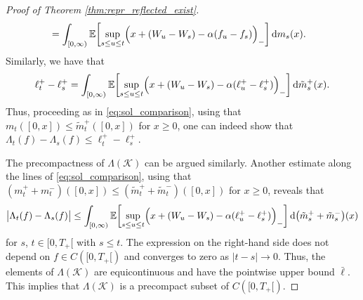 \documentclass[11pt, a4paper]{article}
\theoremstyle{plain}
\theoremstyle{definition}
\theoremstyle{remark}
\numberwithin{equation}{section}
\newcommand{\ev}{\mathbb{E}}
\renewcommand{\d}{\mathrm{d}}
\renewcommand{\cal}[1]{\mathcal{#1}}
\begin{document}
\begin{proof}[Proof of Theorem \ref{thm:repr_reflected_exist}]
\begin{align*}
    &= \int_{[0, \infty)} \ev\biggl[\sup_{s \leq u \leq t} \Bigl(x + (W_u - W_s) - \alpha (f_u - f_s)\Bigr)_-\biggr] \, \d m_s(x).
\end{align*}
Similarly, we have that 
\begin{equation*}
    \ell^+_t - \ell^+_s = \int_{[0, \infty)} \ev\biggl[\sup_{s \leq u \leq t} \Bigl(x + (W_u - W_s) - \alpha (\ell^+_u - \ell^+_s)\Bigr)_-\biggr] \, \d \tilde{m}^+_s(x).
\end{equation*}
Thus, proceeding as in \eqref{eq:sol_comparison}, using that $m_t([0, x]) \leq \tilde{m}^+_t([0, x])$ for $x \geq 0$, one can indeed show that $\Lambda_t(f) - \Lambda_s(f) \leq \ell^+_t - \ell^+_s$.

The precompactness of $\Lambda(\cal{K})$ can be argued similarly. Another estimate along the lines of \eqref{eq:sol_comparison}, using that $(m^+_t + m^-_t)([0, x]) \leq (\tilde{m}^+_t + \tilde{m}^-_t)([0, x])$ for $x \geq 0$, reveals that
\begin{equation*}
    \bigl\lvert \Lambda_t(f) - \Lambda_s(f)\bigr\rvert \leq \int_{[0, \infty)} \ev\biggl[\sup_{s \leq u \leq t} \Bigl(x + (W_u - W_s) - \alpha (\ell^+_u - \ell^+_s)\Bigr)_-\biggr] \, \d \bigl(\tilde{m}^+_s +\tilde{m}^-_s\bigr)(x)
\end{equation*}
for $s$, $t \in [0, T_+[$ with $s \leq t$. The expression on the right-hand side does not depend on $f \in C([0, T_+[)$ and converges to zero as $\lvert t - s\rvert \to 0$. Thus, the elements of $\Lambda(\cal{K})$ are equicontinuous and have the pointwise upper bound $\bar{\ell}$. This implies that $\Lambda(\cal{K})$ is a precompact subset of $C([0, T_+[)$.


\end{proof}
\end{document}
